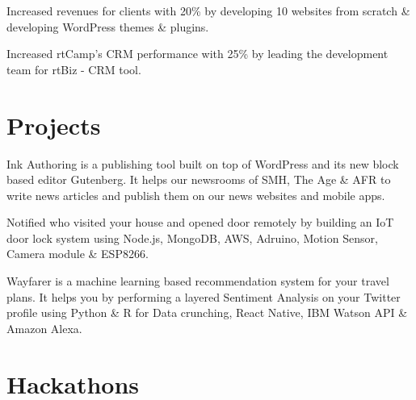 \documentclass[]{deedy-resume-openfont}
\begin{document}
\begin{minipage}[t]{0.66\textwidth}
\begin{tightemize}
\item Increased revenues for clients with 20\% by developing 10 websites from scratch \& developing WordPress themes \& plugins.
\item Increased rtCamp’s CRM performance with 25\% by leading the development team for rtBiz - CRM tool.
\end{tightemize}


\section{Projects}

\location{}
\begin{tightemize}
\item Ink Authoring is a publishing tool built on top of WordPress and its new block based editor Gutenberg. It helps our newsrooms of SMH, The Age \& AFR to write news articles and publish them on our news websites and mobile apps.
\end{tightemize}
\sectionsep

\location{}
\begin{tightemize}
\item Notified who visited your house and opened door remotely by building an IoT door lock system using Node.js, MongoDB, AWS, Adruino, Motion Sensor, Camera module \& ESP8266.
\end{tightemize}
\sectionsep

\location{}
\begin{tightemize}
\item Wayfarer is a machine learning based recommendation system for your travel plans. It helps you by performing a layered Sentiment Analysis on your Twitter profile using Python \& R for Data crunching, React Native, IBM Watson API \& Amazon Alexa.
\end{tightemize}


\section{Hackathons} 
\begin{tabular}{ l l l l }


\end{tabular}
\end{minipage}
\end{document}
